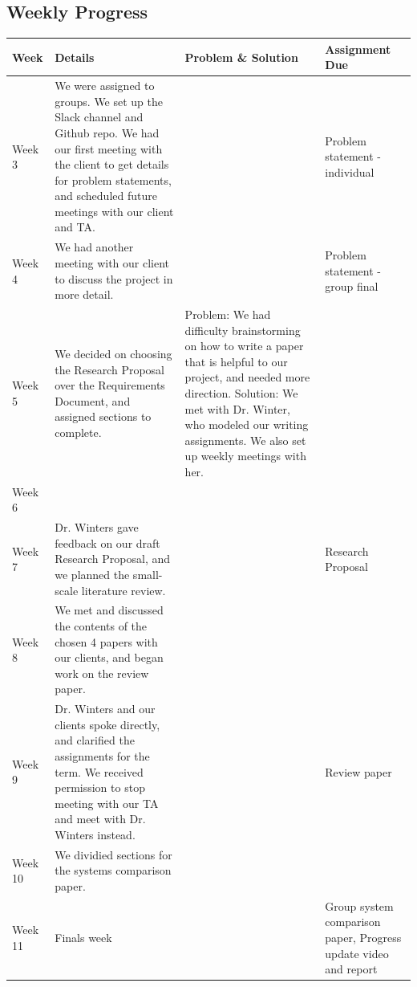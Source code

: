 \documentclass[onecolumn, draftclsnofoot,10pt, compsoc]{IEEEtran}
\begin{document}
\subsection{Weekly Progress}
\begin{tabular}{l | p{5 cm} | p{6 cm}  | p{5 cm} }
    Week & Details & Problem \& Solution & Assignment Due \\ \hline
    Week 3 & We were assigned to groups. We set up the Slack channel and Github repo. We had our first meeting with the client to get details for problem statements, and scheduled future meetings with our client and TA.& & Problem statement - individual \\
    Week 4 & We had another meeting with our client to discuss the project in more detail.& & Problem statement - group final \\
    Week 5 & We decided on choosing the Research Proposal over the Requirements Document, and assigned sections to complete.& Problem: We had difficulty brainstorming on how to write a paper that is helpful to our project, and needed more direction. Solution: We met with Dr. Winter, who modeled our writing assignments. We also set up weekly meetings with her.& \\
    Week 6 & & & \\
    Week 7 & Dr. Winters gave feedback on our draft Research Proposal, and we planned the small-scale literature review. & & Research Proposal \\
    Week 8 & We met and discussed the contents of the chosen 4 papers with our clients, and began work on the review paper.& & \\
    Week 9 & Dr. Winters and our clients spoke directly, and clarified the assignments for the term. We received permission to stop meeting with our TA and meet with Dr. Winters instead.& & Review paper\\
    Week 10 & We dividied sections for the systems comparison paper. & & \\
    Week 11 & Finals week & & Group system comparison paper, Progress update video and report \\
\end{tabular}

\nocite{*}


\end{document}

